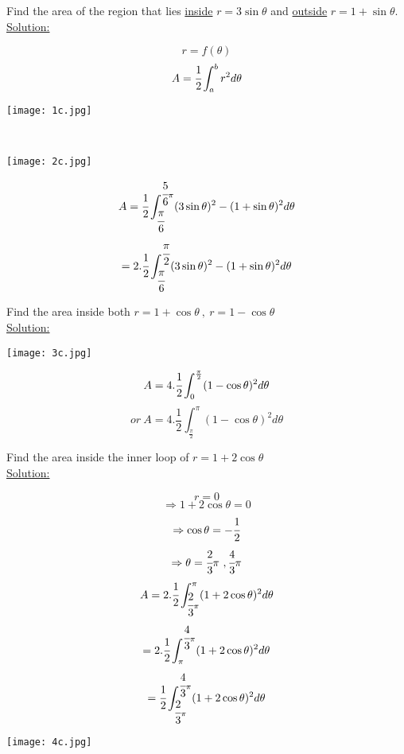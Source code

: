 \noindent{\color{smalt(darkpowderblue)}\rule{\linewidth}{.2mm}}
\begin{example}
Find the area of the region that lies \underline{inside} $r=3\sin\theta$ and \underline{outside} $r=1+\sin\theta.$\\
{\color{smalt(darkpowderblue)} \underline{Solution:}} 
\begin{minipage}{0.5\textwidth}
$$r=f(\theta)$$
$$A=\cfrac{1}{2}\int_a^b r^2d\theta$$
\end{minipage}
\begin{minipage}{0.6\textwidth}
\texttt{[image: 1c.jpg]}
\end{minipage}\\
\begin{minipage}{0.5\textwidth}
\texttt{[image: 2c.jpg]}
\end{minipage}
\begin{minipage}{0.5\textwidth}
$$A=\cfrac{1}{2}\int_{\cfrac{\pi}{6}}^{\cfrac{5}{6}\pi}(3\sin\theta)^2-(1+\sin\theta)^2 d\theta$$
$$=2.\cfrac{1}{2}\int_{\cfrac{\pi}{6}}^{\cfrac{\pi}{2}}(3\sin\theta)^2-(1+\sin\theta)^2 d\theta$$
\end{minipage}
\end{example}
\noindent{\color{smalt(darkpowderblue)}\rule{\linewidth}{.2mm}}
\begin{example}
Find the area inside both $r=1+\cos\theta~,~r=1-\cos\theta$\\
{\color{smalt(darkpowderblue)} \underline{Solution:}}
\begin{minipage}{0.4\textwidth}
\texttt{[image: 3c.jpg]}
\end{minipage}
\begin{minipage}{0.4\textwidth}
$$A=4.\cfrac{1}{2}\int_0^\frac{\pi}{2}(1-\cos\theta)^2 d\theta$$
$$or~A=4.\frac{1}{2}\int_\frac{\pi}{2}^\pi(1-\cos\theta)^2 d\theta$$
\end{minipage}
\end{example}
\noindent{\color{smalt(darkpowderblue)}\rule{\linewidth}{.2mm}}
\begin{example}
Find the area inside the inner loop of $r=1+2\cos\theta$\\
{\color{smalt(darkpowderblue)} \underline{Solution:}} \\ 
\begin{minipage}{0.5\textwidth}
$$r=0$$
$$\Rightarrow 1+2\cos\theta=0$$
$$\Rightarrow\cos\theta=-\cfrac{1}{2}$$
$$\Rightarrow\theta=\cfrac{2}{3}\pi~,\cfrac{4}{3}\pi$$
$$A=2.\cfrac{1}{2}\int_{\cfrac{2}{3}\pi}^\pi(1+2\cos\theta)^2 d\theta$$
$$=2.\cfrac{1}{2}\int_{\pi}^{\cfrac{4}{3}\pi}(1+2\cos\theta)^2 d\theta$$
$$=\cfrac{1}{2}\int_{\cfrac{2}{3}\pi}^{\cfrac{4}{3}\pi}(1+2\cos\theta)^2 d\theta$$
\end{minipage}
\begin{minipage}{0.5\textwidth}
\texttt{[image: 4c.jpg]}
\end{minipage}
\end{example}
